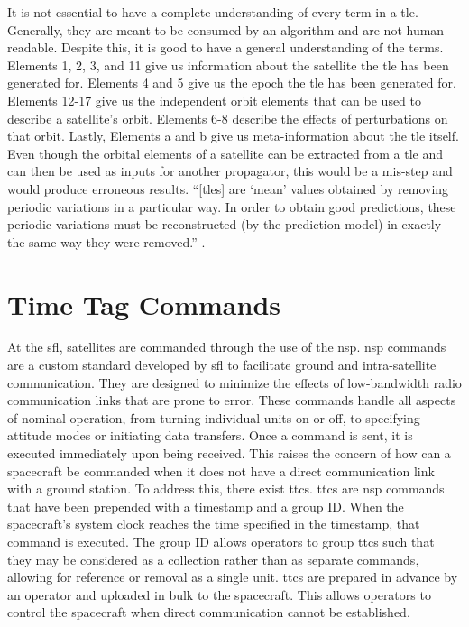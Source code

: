 It is not essential to have a complete understanding of every term in a
\gls{tle}. Generally, they are meant to be consumed by an algorithm and are not
human readable. Despite this, it is good to have a general understanding of the
terms.  Elements 1, 2, 3, and 11 give us information about the satellite the
\gls{tle} has been generated for. Elements 4 and 5 give us the epoch the
\gls{tle} has been generated for. Elements 12-17 give us the independent orbit
elements that can be used to describe a satellite's orbit. Elements 6-8
describe the effects of perturbations on that orbit. Lastly, Elements a and b
give us meta-information about the \gls{tle} itself. Even though the orbital
elements of a satellite can be extracted from a \gls{tle} and can then be used
as inputs for another propagator, this would be a mis-step and would produce
erroneous results. ``[\glspl{tle}] are `mean' values obtained by removing
periodic variations in a particular way. In order to obtain good predictions,
these periodic variations must be reconstructed (by the prediction model) in
exactly the same way they were removed.'' \cite{hoots_spacetrack_1980}.





\section{Time Tag Commands}

At the \gls{sfl}, satellites are commanded through the use of the \gls{nsp}.
\gls{nsp} commands are a custom standard developed by \gls{sfl} to facilitate
ground and intra-satellite communication. They are designed to minimize the
effects of low-bandwidth radio communication links that are prone to error.
These commands handle all aspects of nominal operation, from turning individual
units on or off, to specifying attitude modes or initiating data transfers.
Once a command is sent, it is executed immediately upon being received. This
raises the concern of how can a spacecraft be commanded when it does not have a
direct communication link with a ground station. To address this, there exist
\glspl{ttc}. \glspl{ttc} are \gls{nsp} commands that have been prepended with a
timestamp and a group ID. When the spacecraft’s system clock reaches the time
specified in the timestamp, that command is executed.  The group ID allows
operators to group \glspl{ttc} such that they may be considered as a collection
rather than as separate commands, allowing for reference or removal as a single
unit.  \glspl{ttc} are prepared in advance by an operator and uploaded in bulk
to the spacecraft.  This allows operators to control the spacecraft when direct
communication cannot be established.



